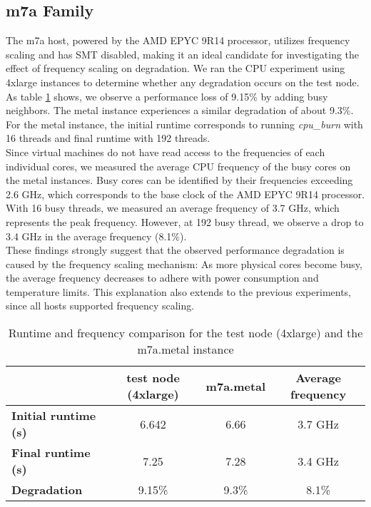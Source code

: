 \subsection{m7a Family}
The m7a host, powered by the AMD EPYC 9R14 processor, utilizes frequency scaling and has SMT disabled, 
making it an ideal candidate for investigating the effect of frequency scaling on degradation. 
We ran the CPU experiment using 4xlarge instances to determine whether any degradation occurs on the 
test node. As table \ref{tab::m7a} shows, we observe a performance loss of 9.15\% by adding busy neighbors.  
The metal instance experiences a similar degradation of about 9.3\%. For the metal instance, the initial 
runtime corresponds to running \textit{cpu\_burn} with 16 threads and final runtime with 192 threads. \\
Since virtual machines do not have read access to the frequencies of each individual cores, 
we measured the average CPU frequency of the busy cores on the metal instances.
Busy cores can be identified by their frequencies exceeding 2.6 GHz, which corresponds to
the base clock of the AMD EPYC 9R14 processor. With 16 busy threads, we measured an average 
frequency of 3.7 GHz, which represents the peak frequency. 
However, at 192 busy thread, we observe a drop to 3.4 GHz in the average frequency (8.1\%). \\ 
These findings strongly suggest that the observed performance degradation is caused by the 
frequency scaling mechanism: As more physical cores become busy, the average frequency decreases 
to adhere with power consumption and temperature limits. This explanation also extends to the 
previous experiments, since all hosts supported 
frequency scaling. 
\begin{table}[h]
\centering
\small
\begin{tabular}{|l|c|c|c|}
\hline
 & \textbf{test node (4xlarge)} & \textbf{m7a.metal} & \textbf{Average frequency} \\
\hline
\textbf{Initial runtime (s)} & 6.642 & 6.66 & 3.7 GHz \\
\hline
\textbf{Final runtime (s) } & 7.25 & 7.28 & 3.4 GHz \\
\hline
\textbf{Degradation} & 9.15\% & 9.3\% & 8.1\% \\
\hline
\end{tabular}
\caption{Runtime and frequency comparison for the test node (4xlarge) and the m7a.metal instance}
\label{tab::m7a}
\end{table}

